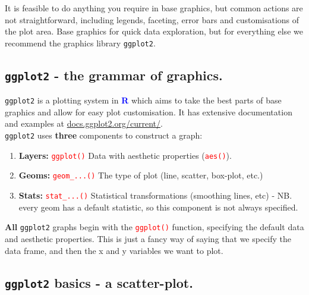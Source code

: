 \documentclass[a4paper,12pt]{article}
\newcommand\boldblue[1]{\textcolor{blue}{\textbf{#1}}}
\newcommand\code[1]{\textcolor{red}{\texttt{#1}}}
\begin{document}
It is feasible to do anything you require in base graphics, but common actions are not straightforward, including legends, faceting, error bars and customisations of the plot area. Base graphics for quick data exploration, but for everything else we recommend the graphics library \texttt{ggplot2}.

\subsection{\texttt{ggplot2} - the grammar of graphics.}

\texttt{ggplot2} is a plotting system in \boldblue{R} which aims to take the best parts of base graphics and allow for easy plot customisation. It has extensive documentation and examples at \url{docs.ggplot2.org/current/}. \\


\texttt{ggplot2} uses \textbf{three} components to construct a graph:

\begin{enumerate}
\item \textbf{Layers:} \code{ggplot()} Data with aesthetic properties (\code{aes()}).
\item \textbf{Geoms:} \code{geom\_...()} The type of plot (line, scatter, box-plot, etc.)
\item \textbf{Stats:} \code{stat\_...()} Statistical transformations (smoothing lines, etc) - NB. every geom has a default statistic, so this component is not always specified.
\end{enumerate}

\textbf{All} \texttt{ggplot2} graphs begin with the \code{ggplot()} function, specifying the default data and aesthetic properties. This is just a fancy way of saying that we specify the data frame, and then the x and y variables we want to plot.

\subsection{\texttt{ggplot2} basics - a scatter-plot.}
\end{document}
